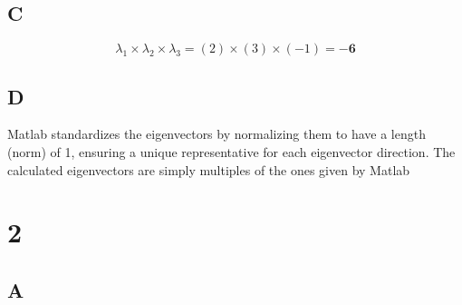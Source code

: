 \documentclass{article}
\begin{document}
\subsection*{C}


\[
	\lambda_1 \times \lambda_2 \times \lambda_3 = (2) \times (3) \times (-1) = \mathbf{-6}
\]

\subsection*{D}

Matlab standardizes the eigenvectors by normalizing them to have a  length (norm) of 1, ensuring a unique representative for each eigenvector direction. The calculated eigenvectors are simply multiples of the ones given by Matlab

\section*{2}
\subsection*{A}
\end{document}

